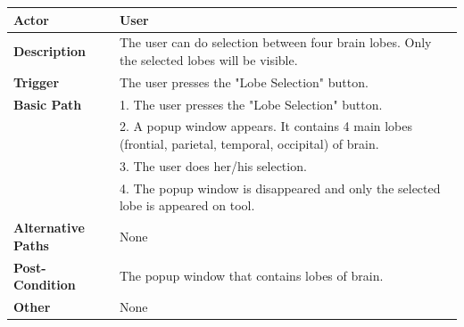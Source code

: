 \documentclass[paper=a4, fontsize=12pt]{scrartcl}	%
\numberwithin{equation}{section}		%
\numberwithin{figure}{section}			%
\numberwithin{table}{section}				%
\newcommand{\skipsubsection}[0]{\vspace{1cm}}
\begin{document}
    	\begin{center}
        	\begin{tabular}{ | p{4cm} | p{9cm} |}
            	\hline
                	\textbf{Actor} & User\\ \hline
                    \textbf{Description} & The user can do selection between four brain lobes. Only the selected lobes will be visible.\\ \hline
                    \textbf{Trigger} & The user presses the "Lobe Selection" button.\\ \hline
                    \textbf{Basic Path} & 1. The user presses the "Lobe Selection" button.\\
                    & 2. A popup window appears. It contains 4 main lobes (frontial, parietal, temporal, occipital) of brain.\\
                    & 3. The user does her/his selection.\\
                    & 4. The popup window is disappeared and only the selected lobe is appeared on tool.\\ \hline
                    \textbf{Alternative Paths} & None\\ \hline
                    \textbf{Post-Condition} & The popup window that contains lobes of brain.\\ \hline
                    \textbf{Other} & None\\
                \hline
            \end{tabular}
        \end{center}
    \skipsubsection
    
\end{document}
